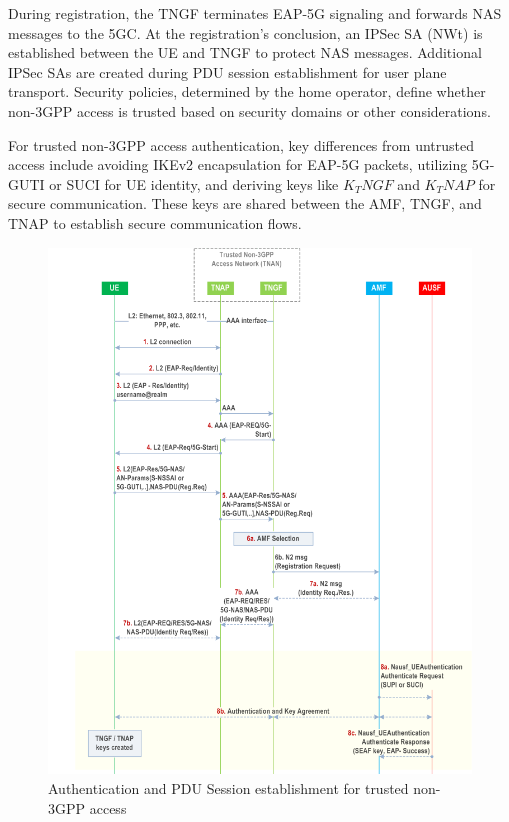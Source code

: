 During registration, the \ac{TNGF} terminates \ac{EAP-5G} signaling and forwards \ac{NAS} messages to the \ac{5GC}. At the registration's conclusion, an \ac{IPSec SA} (NWt) is established between the \ac{UE} and \ac{TNGF} to protect \ac{NAS} messages. Additional \acp{IPSec SA} are created during \ac{PDU} session establishment for user plane transport. Security policies, determined by the home operator, define whether non-\ac{3GPP} access is trusted based on security domains or other considerations.

For trusted non-\ac{3GPP} access authentication, key differences from untrusted access include avoiding \ac{IKEv2} encapsulation for \ac{EAP-5G} packets, utilizing \ac{5G-GUTI} or \ac{SUCI} for \ac{UE} identity, and deriving keys like $K_TNGF$ and $K_TNAP$ for secure communication. These keys are shared between the \ac{AMF}, \ac{TNGF}, and \ac{TNAP} to establish secure communication flows.

\begin{figure}
    \centering
    \includegraphics[width=0.75\linewidth]{figs/Authentication and PDU Session establishment for trusted non-3GPP access_1.png}
    \caption{Authentication and \ac{PDU} Session establishment for trusted non-\ac{3GPP} access}
    \label{fig:Authentication and PDU Session establishment for trusted non-3GPP access_1}
\end{figure}

